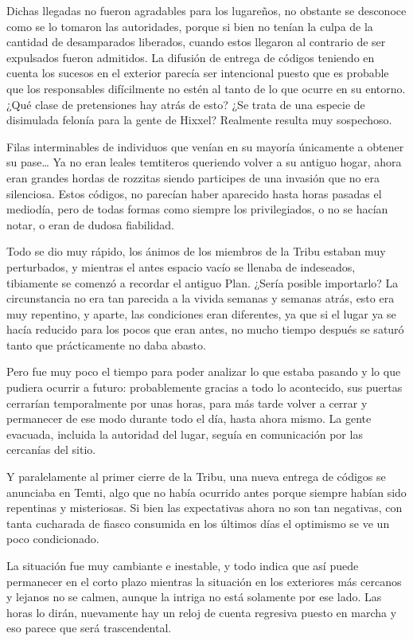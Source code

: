 \documentclass[
  spanish,
]{book}
\begin{document}
Dichas llegadas no fueron agradables para los lugareños, no obstante se desconoce como se lo tomaron las autoridades, porque si bien no tenían la culpa de la cantidad de desamparados liberados, cuando estos llegaron al contrario de ser expulsados fueron admitidos. La difusión de entrega de códigos teniendo en cuenta los sucesos en el exterior parecía ser intencional puesto que es probable que los responsables difícilmente no estén al tanto de lo que ocurre en su entorno. ¿Qué clase de pretensiones hay atrás de esto? ¿Se trata de una especie de disimulada felonía para la gente de Hixxel? Realmente resulta muy sospechoso.

Filas interminables de individuos que venían en su mayoría únicamente a obtener su pase\ldots{} Ya no eran leales temtiteros queriendo volver a su antiguo hogar, ahora eran grandes hordas de rozzitas siendo participes de una invasión que no era silenciosa. Estos códigos, no parecían haber aparecido hasta horas pasadas el mediodía, pero de todas formas como siempre los privilegiados, o no se hacían notar, o eran de dudosa fiabilidad.

Todo se dio muy rápido, los ánimos de los miembros de la Tribu estaban muy perturbados, y mientras el antes espacio vacío se llenaba de indeseados, tibiamente se comenzó a recordar el antiguo Plan. ¿Sería posible importarlo? La circunstancia no era tan parecida a la vivida semanas y semanas atrás, esto era muy repentino, y aparte, las condiciones eran diferentes, ya que si el lugar ya se hacía reducido para los pocos que eran antes, no mucho tiempo después se saturó tanto que prácticamente no daba abasto.

Pero fue muy poco el tiempo para poder analizar lo que estaba pasando y lo que pudiera ocurrir a futuro: probablemente gracias a todo lo acontecido, sus puertas cerrarían temporalmente por unas horas, para más tarde volver a cerrar y permanecer de ese modo durante todo el día, hasta ahora mismo. La gente evacuada, incluida la autoridad del lugar, seguía en comunicación por las cercanías del sitio.

Y paralelamente al primer cierre de la Tribu, una nueva entrega de códigos se anunciaba en Temti, algo que no había ocurrido antes porque siempre habían sido repentinas y misteriosas. Si bien las expectativas ahora no son tan negativas, con tanta cucharada de fiasco consumida en los últimos días el optimismo se ve un poco condicionado.

La situación fue muy cambiante e inestable, y todo indica que así puede permanecer en el corto plazo mientras la situación en los exteriores más cercanos y lejanos no se calmen, aunque la intriga no está solamente por ese lado. Las horas lo dirán, nuevamente hay un reloj de cuenta regresiva puesto en marcha y eso parece que será trascendental.
\end{document}
